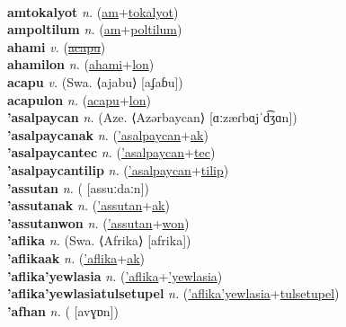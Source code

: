  \label{amhulinoluat} \\
\textbf{amtokalyot} \textit{n.} (\hyperref[am]{am}+\hyperref[tokalyot]{tokalyot})
 \label{amtokalyot} \\
\textbf{ampoltilum} \textit{n.} (\hyperref[am]{am}+\hyperref[poltilum]{poltilum})
 \label{ampoltilum} \\
\textbf{ahami} \textit{v.} (\hyperref[acapu]{\sout{acapu}})
 \label{ahami} \\
\textbf{ahamilon} \textit{n.} (\hyperref[ahami]{ahami}+\hyperref[lon]{lon})
 \label{ahamilon} \\
\textbf{acapu} \textit{v.} (Swa. ⟨ajabu⟩ [aʄaɓu])
 \label{acapu} \\
\textbf{acapulon} \textit{n.} (\hyperref[acapu]{acapu}+\hyperref[lon]{lon})
 \label{acapulon} \\
\textbf{'asalpaycan} \textit{n.} (Aze. ⟨Azərbaycan⟩ [ɑːzæɾbɑjˈd͡ʒɑn])
 \label{'asalpaycan} \\
\textbf{'asalpaycanak} \textit{n.} (\hyperref['asalpaycan]{'asalpaycan}+\hyperref[ak]{ak})
 \label{'asalpaycanak} \\
\textbf{'asalpaycantec} \textit{n.} (\hyperref['asalpaycan]{'asalpaycan}+\hyperref[tec]{tec})
 \label{'asalpaycantec} \\
\textbf{'asalpaycantilip} \textit{n.} (\hyperref['asalpaycan]{'asalpaycan}+\hyperref[tilip]{tilip})
 \label{'asalpaycantilip} \\
\textbf{'assutan} \textit{n.} ( [assuːdaːn])
 \label{'assutan} \\
\textbf{'assutanak} \textit{n.} (\hyperref['assutan]{'assutan}+\hyperref[ak]{ak})
 \label{'assutanak} \\
\textbf{'assutanwon} \textit{n.} (\hyperref['assutan]{'assutan}+\hyperref[won]{won})
 \label{'assutanwon} \\
\textbf{'aflika} \textit{n.} (Swa. ⟨Afrika⟩ [afrika])
 \label{'aflika} \\
\textbf{'aflikaak} \textit{n.} (\hyperref['aflika]{'aflika}+\hyperref[ak]{ak})
 \label{'aflikaak} \\
\textbf{'aflika'yewlasia} \textit{n.} (\hyperref['aflika]{'aflika}+\hyperref['yewlasia]{'yewlasia})
 \label{'aflika'yewlasia} \\
\textbf{'aflika'yewlasiatulsetupel} \textit{n.} (\hyperref['aflika'yewlasia]{'aflika'yewlasia}+\hyperref[tulsetupel]{tulsetupel})
 \label{'aflika'yewlasiatulsetupel} \\
\textbf{'afhan} \textit{n.} ( [avɣɒn])
 \label{'afhan} \\
